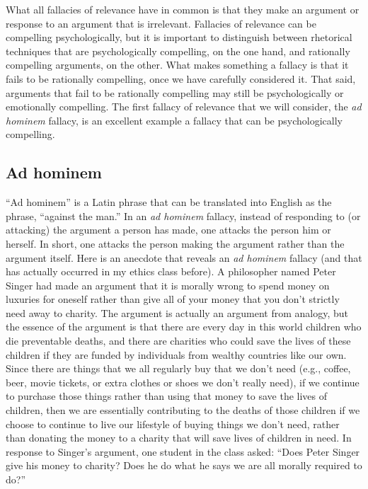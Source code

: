 What all fallacies of relevance have in common is that they make an argument or response to an argument that is irrelevant. Fallacies of relevance can be compelling psychologically, but it is important to distinguish between rhetorical techniques that are psychologically compelling, on the one hand, and rationally compelling arguments, on the other. What makes something a fallacy is that it fails to be rationally compelling, once we have carefully considered it. That said, arguments that fail to be rationally compelling may still be psychologically or emotionally compelling. The first fallacy of relevance that we will consider, the \textit{ad hominem} fallacy, is an excellent example a fallacy that can be psychologically compelling.

\subsection{Ad hominem}

``Ad hominem'' is a Latin phrase that can be translated into English as the phrase, ``against the man.'' In an \textit{ad hominem} fallacy, instead of responding to (or attacking) the argument a person has made, one attacks the person him or herself. In short, one attacks the person making the argument rather than the argument itself. Here is an anecdote that reveals an \textit{ad hominem} fallacy (and that has actually occurred in my ethics class before). A philosopher named Peter Singer had made an argument that it is morally wrong to spend money on luxuries for oneself rather than give all of your money that you don't strictly need away to charity. The argument is actually an argument from analogy, but the essence of the argument is that there are every day in this world children who die preventable deaths, and there are charities who could save the lives of these children if they are funded by individuals from wealthy countries like our own. Since there are things that we all
regularly buy that we don't need (e.g., coffee, beer, movie tickets, or extra clothes or shoes we don't really need), if we continue to purchase those things rather than using that money to save the lives of children, then we are essentially contributing to the deaths of those children if we choose to continue to live our lifestyle of buying things we
don't need, rather than donating the money to a charity that will save lives of children in need. In response to Singer's argument, one student in the class asked: ``Does Peter Singer give his money to charity? Does he do what he says we are all morally required to do?'' 

